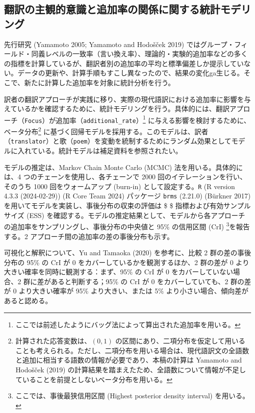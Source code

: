 \documentclass[
  letterpaper,
  DIV=11,
  numbers=noendperiod]{scrartcl}
\begin{document}
\subsection{翻訳の主観的意識と追加率の関係に関する統計モデリング}\label{ux7ffbux8a33ux306eux4e3bux89b3ux7684ux610fux8b58ux3068ux8ffdux52a0ux7387ux306eux95a2ux4fc2ux306bux95a2ux3059ux308bux7d71ux8a08ux30e2ux30c7ux30eaux30f3ux30b0}

先行研究 (Yamamoto 2005; Yamamoto and Hodošček 2019)
ではグループ・フィールド・同義レベルの一致率（言い換え率）、理論的・実験的追加率などの多くの指標を計算しているが、翻訳者別の追加率の平均と標準偏差しか提示していない。データの更新や、計算手順もすこし異なったので、結果の変化ga生じる。そこで、新たに計算した追加率を対象に統計分析を行う。

訳者の翻訳アプローチが実践に移り、実際の現代語訳における追加率に影響を与えているかを確認するために、統計モデリングを行う。具体的には、翻訳アプローチ（\texttt{Focus}）が追加率（\texttt{additional\_rate}）\footnote{ここでは前述したようにバッグ法によって算出された追加率を用いる。}
に与える影響を検討するために、ベータ分布\footnote{計算された応答変数は、\((0, 1)\)
  の区間にあり、二項分布を仮定して用いることも考えられる。ただし、二項分布を用いる場合は、現代語訳文の全語数と追加に相当する語数の情報が必要であり、本稿の計算は
  Yamamoto and Hodošček (2019)
  の計算結果を踏まえたため、全語数について情報が不足していることを前提としないベータ分布を用いる。}
に基づく回帰モデルを採用する。このモデルは、訳者（\texttt{translator}）と歌（\texttt{poem}）を変動を統制するためにランダム効果としてモデルに入れている。統計モデルは補足資料を参照されたい。

モデルの推定は、Markov Chain Monte Carlo (MCMC)
法を用いる。具体的には、4 つのチェーンを使用し、各チェーンで 2000
回のイテレーションを行い、そのうち 1000 回をウォームアップ (burn-in)
として設定する。\texttt{R} (R version 4.3.3 (2024-02-29)) (R Core Team
2024) パッケージ \texttt{brms} (2.21.0) (Bürkner 2017)
を用いてモデルを実装し、事後分布の収束の評価は \$  \$
指標および有効サンプルサイズ (ESS)
を確認する。モデルの推定結果として、モデルから各アプローチの追加率をサンプリングし、事後分布の中央値と
95\% の信用区間 (CrI) \footnote{ここでは、事後最狭信用区間 (Highest
  posterior density interval) を用いる。}を報告する。2
アプローチ間の追加率の差の事後分布も示す。

可視化と解釈について、Yu and Tamaoka (2020) を参考に、比較 2
群の差の事後分布の 95\% の CrI が 0 をカバーしているかを観測するほか、2
群の差が 0 より大きい確率を同時に観測する：まず、95\% の CrI が 0
をカバーしていない場合、2 群に差があると判断する；95\% の CrI が 0
をカバーしていても、2 群の差が 0 より大きい確率が 95\%
より大きい、または 5\% より小さい場合、傾向差があると認める。
\end{document}
